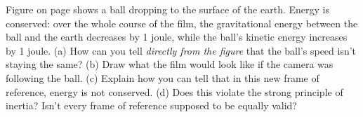 Figure  on page \pageref{fig:film-dropping}
shows a ball dropping to the surface of the earth. Energy is conserved: over the
whole course of the film, the gravitational energy between the ball and the earth decreases
by 1 joule, while the ball's kinetic energy increases by 1 joule.\hwendpart
(a) How can you tell \emph{directly from the figure}
 that the ball's speed isn't staying the same?\hwendpart
(b) Draw what the film would look like if the camera was following the ball.\hwendpart
(c) Explain how you can tell that in this new frame of reference, energy is not conserved.\hwendpart
(d) Does this violate the strong principle of inertia? Isn't every frame of reference supposed to be equally valid?
